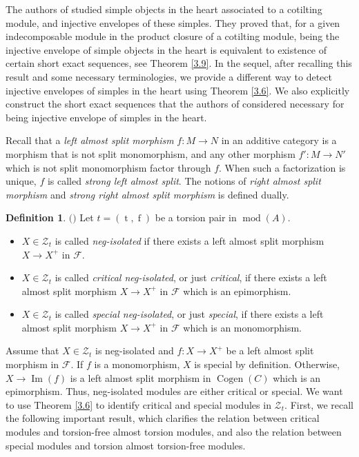 \documentclass[12pt]{amsart}
\numberwithin{equation}{section}
\theoremstyle{definition}
\newtheorem{definition}[lemma]{Definition}
\DeclareMathOperator{\modd}{mod}
\DeclareMathOperator{\Cogen}{Cogen}
\DeclareMathOperator{\Imm}{Im}
\DeclareMathOperator{\ts}{t}
\DeclareMathOperator{\fs}{f}
\newtheorem*{theorem 0*}{Theorem}
\newtheorem*{theorem a*}{Theorem A}
\newtheorem*{theorem b*}{Theorem B}
\numberwithin{diagram}{section}
\begin{document}
The authors of \cite{AHL} studied simple objects in the heart associated to a cotilting module, and injective envelopes of these simples.
They proved that, for a given indecomposable module in the product closure of a cotilting module, being the injective envelope of simple objects in the heart is equivalent to existence of certain short exact sequences, see Theorem \ref{3.9}.
In the sequel, after recalling this result and some necessary terminologies, we provide a different way to detect injective envelopes of simples in the heart using Theorem \ref{3.6}.
We also explicitly construct the short exact sequences that the authors of \cite{AHL} considered necessary for being injective envelope of simples in the heart.

Recall that a {\it left almost split morphism} $f:M\rightarrow N$ in an additive category is a morphism that is not split monomorphism, and any other morphism $f':M\rightarrow N'$ which is not split monomorphism factor through $f$. When such a factorization is unique, $f$ is called {\it strong left almost split}. The notions of {\it right almost split morphism} and {\it strong right almost split morphism} is defined dually.
\begin{definition}$($\cite{AHL}$)$
Let $t=(\ts,\fs)$ be a torsion pair in $\modd(A)$.
\begin{itemize}
\item[(1)]
$X\in \mathcal{Z}_t$ is called {\it neg-isolated} if there exists a left almost split morphism $X\rightarrow X^{+}$ in $\mathcal{F}$.
\item[(2)]
$X\in \mathcal{Z}_t$ is called {\it critical neg-isolated}, or just {\it critical}, if there exists a left almost split morphism $X\rightarrow X^{+}$ in $\mathcal{F}$ which is an epimorphism. 
\item[(3)]
$X\in \mathcal{Z}_t$ is called {\it special neg-isolated}, or just {\it special}, if there exists a left almost split morphism $X\rightarrow X^{+}$ in $\mathcal{F}$ which is an monomorphism. 
\end{itemize}
\end{definition}

Assume that $X\in \mathcal{Z}_t$ is neg-isolated and $f:X\rightarrow X^{+}$ be a left almost split morphism in $\mathcal{F}$. If $f$ is a monomorphism, $X$ is special by definition. Otherwise, $X\rightarrow\Imm(f)$ is a left almost split morphism in $\Cogen(C)$ which is an epimorphism. Thus, neg-isolated modules are either critical or special.
We want to use Theorem \ref{3.6} to identify critical and special modules in $\mathcal{Z}_t$. First, we recall the following important result, which clarifies the relation between critical modules and torsion-free almost torsion modules, and also the relation between special modules and torsion almost torsion-free modules.
\end{document}
